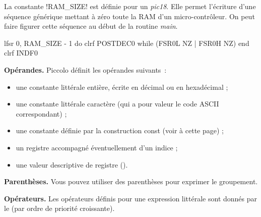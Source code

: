La constante \pic!RAM_SIZE! est définie pour un \emph{pic18}. Elle permet l'écriture d'une séquence générique mettant à zéro toute la RAM d'un micro-contrôleur. On peut faire figurer cette séquence au début de la routine \emph{main}.


\begin{piccolo}
  lfsr 0, RAM_SIZE - 1
  do
    clrf POSTDEC0
  while (FSR0L NZ | FSR0H NZ)
  end
  clrf INDF0
\end{piccolo}



\textbf{Opérandes.} Piccolo définit les opérandes suivants~:
\begin{itemize}
  \item une constante littérale entière, écrite en décimal ou en hexadécimal ;
  \item une constante littérale caractère (qui a pour valeur le code ASCII correspondant) ;
  \item une constante définie par la construction const (voir à cette page) ;
  \item un registre accompagné éventuellement d’un indice ;
  \item une valeur descriptive de registre ().
\end{itemize}

\textbf{Parenthèses.} Vous pouvez utiliser des parenthèses pour exprimer le groupement.

\textbf{Opérateurs.} Les opérateurs définis pour une expression littérale sont donnés par le  (par ordre de priorité croissante).

